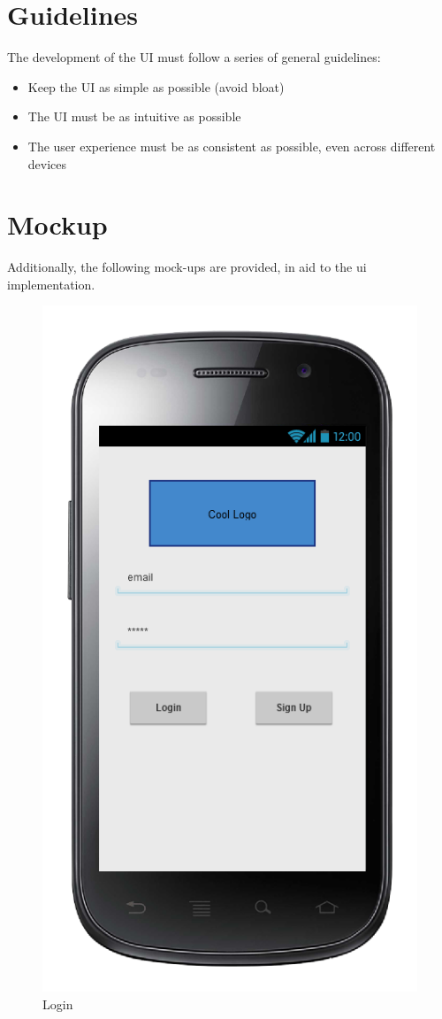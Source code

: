 \section{Guidelines}
The development of the UI must follow a series of general guidelines:
\begin{itemize}
 \item Keep the UI as simple as possible (avoid bloat)
 \item The UI must be as intuitive as possible
 \item The user experience must be as consistent as possible, even across different devices
\end{itemize}

\section{Mockup}
Additionally, the following mock-ups are provided, in aid to the ui implementation.
\begin{figure} [h]
\centering
  	  \includegraphics[scale=0.5]{../RASD/ui/sequencelogin.png}
\caption{Login}
\end{figure}

